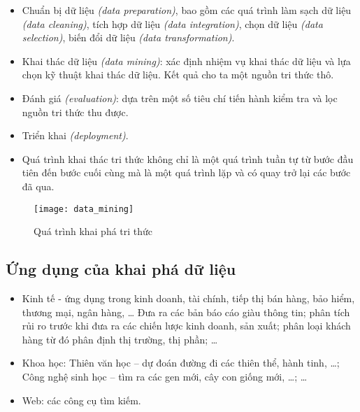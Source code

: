 \begin{itemize}
    \item Chuẩn bị dữ liệu \textit{(data preparation)}, bao gồm các quá trình làm sạch dữ liệu
    \textit{(data cleaning)}, tích hợp dữ liệu \textit{(data integration)}, chọn dữ liệu \textit{(data selection)},
    biến đổi dữ liệu \textit{(data transformation)}.
    \item Khai thác dữ liệu \textit{(data mining)}: xác định nhiệm vụ khai thác dữ liệu và lựa
    chọn kỹ thuật khai thác dữ liệu. Kết quả cho ta một nguồn tri thức thô.
    \item Đánh giá \textit{(evaluation)}: dựa trên một số tiêu chí tiến hành kiểm tra và lọc
    nguồn tri thức thu được. 
    \item Triển khai \textit{(deployment)}.
    \item Quá trình khai thác tri thức không chỉ là một quá trình tuần tự từ bước đầu
    tiên đến bước cuối cùng mà là một quá trình lặp và có quay trở lại các bước đã qua.
\end{itemize}
\begin{figure}[!htbp]
    \centering
    \texttt{[image: data\_mining]}
    \caption{Quá trình khai phá tri thức}
    \label{fig:x cubed graph}
\end{figure}
\FloatBarrier
\subsection{Ứng dụng của khai phá dữ liệu}
\begin{itemize}
    \item Kinh tế - ứng dụng trong kinh doanh, tài chính, tiếp thị bán hàng, bảo hiểm,
    thương mại, ngân hàng, … Đưa ra các bản báo cáo giàu thông tin; phân tích rủi ro
    trước khi đưa ra các chiến lược kinh doanh, sản xuất; phân loại khách hàng từ đó phân định thị trường, thị phần; …
    \item Khoa học: Thiên văn học – dự đoán đường đi các thiên thể, hành tinh, …;
    Công nghệ sinh học – tìm ra các gen mới, cây con giống mới, …; …
    \item Web: các công cụ tìm kiếm.  
\end{itemize}